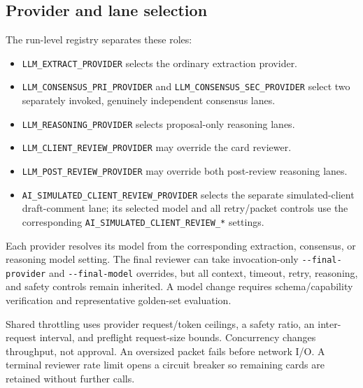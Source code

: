 \documentclass[
]{article}
\providecommand{\tightlist}{%
  \setlength{\itemsep}{0pt}\setlength{\parskip}{0pt}}
\begin{document}
\subsection{Provider and lane
selection}\label{provider-and-lane-selection}

The run-level registry separates these roles:

\begin{itemize}
\tightlist
\item
  \texttt{LLM\_\allowbreak{}EXTRACT\_\allowbreak{}PROVIDER} selects the
  ordinary extraction provider.
\item
  \texttt{LLM\_\allowbreak{}CONSENSUS\_\allowbreak{}PRI\_\allowbreak{}PROVIDER}
  and
  \texttt{LLM\_\allowbreak{}CONSENSUS\_\allowbreak{}SEC\_\allowbreak{}PROVIDER}
  select two separately invoked, genuinely independent consensus lanes.
\item
  \texttt{LLM\_\allowbreak{}REASONING\_\allowbreak{}PROVIDER} selects
  proposal-only reasoning lanes.
\item
  \texttt{LLM\_\allowbreak{}CLIENT\_\allowbreak{}REVIEW\_\allowbreak{}PROVIDER}
  may override the card reviewer.
\item
  \texttt{LLM\_\allowbreak{}POST\_\allowbreak{}REVIEW\_\allowbreak{}PROVIDER}
  may override both post-review reasoning lanes.
\item
  \texttt{AI\_\allowbreak{}SIMULATED\_\allowbreak{}CLIENT\_\allowbreak{}REVIEW\_\allowbreak{}PROVIDER}
  selects the separate simulated-client draft-comment lane; its selected
  model and all retry/packet controls use the corresponding
  \texttt{AI\_\allowbreak{}SIMULATED\_\allowbreak{}CLIENT\_\allowbreak{}REVIEW\_\allowbreak{}*}
  settings.
\end{itemize}

Each provider resolves its model from the corresponding extraction,
consensus, or reasoning model setting. The final reviewer can take
invocation-only \texttt{-\/-final-provider} and \texttt{-\/-final-model}
overrides, but all context, timeout, retry, reasoning, and safety
controls remain inherited. A model change requires schema/capability
verification and representative golden-set evaluation.

Shared throttling uses provider request/token ceilings, a safety ratio,
an inter-request interval, and preflight request-size bounds.
Concurrency changes throughput, not approval. An oversized packet fails
before network I/O. A terminal reviewer rate limit opens a circuit
breaker so remaining cards are retained without further calls.
\end{document}
